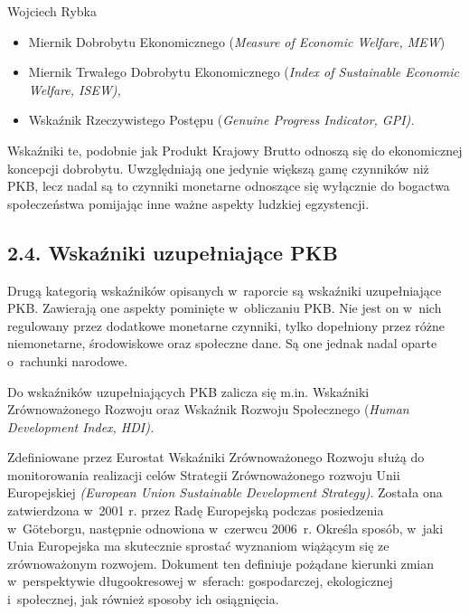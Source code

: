 \begin{artplenv}{Wojciech Rybka}
\begin{itemize}
\item Miernik Dobrobytu Ekonomicznego (\textit{Measure of Economic Welfare, MEW})
\item Miernik Trwałego Dobrobytu Ekonomicznego (\textit{Index of Sustainable Economic Welfare, ISEW),}
\item Wskaźnik Rzeczywistego Postępu (\textit{Genuine Progress Indicator, GPI).}
\end{itemize}

Wskaźniki te, podobnie jak Produkt Krajowy Brutto odnoszą się do ekonomicznej koncepcji dobrobytu. Uwzględniają one
jedynie większą gamę czynników niż PKB, lecz nadal są to czynniki monetarne odnoszące się wyłącznie do bogactwa
społeczeństwa pomijając inne ważne aspekty ludzkiej egzystencji.

\subsection{2.4. Wskaźniki uzupełniające PKB}
Drugą kategorią wskaźników opisanych w~raporcie są wskaźniki uzupełniające PKB. Zawierają one aspekty
pominięte w~obliczaniu PKB. Nie jest on w~nich regulowany przez dodatkowe monetarne czynniki, tylko dopełniony przez różne
niemonetarne, środowiskowe oraz społeczne dane. Są one jednak nadal oparte o~rachunki narodowe.

Do wskaźników uzupełniających PKB zalicza się m.in. Wskaźniki Zrównoważonego Rozwoju oraz Wskaźnik Rozwoju Społecznego
(\textit{Human Development Index, HDI).}

Zdefiniowane przez Eurostat Wskaźniki Zrównoważonego Rozwoju służą do monitorowania realizacji celów Strategii
Zrównoważonego rozwoju Unii Europejskiej \textit{(European Union Sustainable Development Strategy)}. Została ona
zatwierdzona w~2001 r. przez Radę Europejską podczas posiedzenia w~Göteborgu, następnie odnowiona w~czerwcu 2006~r.
Określa sposób, w~jaki Unia Europejska ma skutecznie sprostać wyznaniom wiążącym się ze zrównoważonym rozwojem.
Dokument ten definiuje pożądane kierunki zmian w~perspektywie długookresowej w~sferach: gospodarczej,
ekologicznej i~społecznej, jak również sposoby ich osiągnięcia. 


\end{artplenv}
